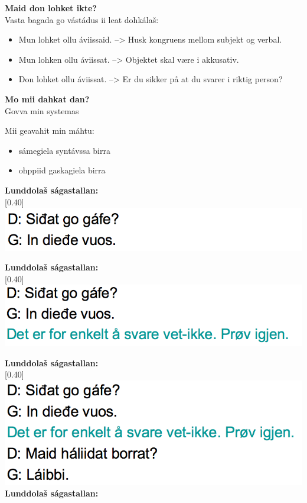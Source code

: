 \documentclass[landscape,norsk,11pt]{seminar}
\begin{document}
\begin{slide}
\newslide
\textbf{Maid don lohket ikte?}\\
Vasta bagada go vástádus ii leat dohkálaš:
\begin{itemize}
\item Mun lohket ollu \'aviissaid. --> Husk kongruens mellom subjekt og verbal.
\item Mun lohken ollu \'aviissat. --> Objektet skal være i akkusativ.
\item Don lohket ollu \'aviissat. --> Er du sikker på at du svarer i riktig person?
\end{itemize}

\newslide
\textbf{Mo mii dahkat dan?}\\
Govva min systemas

\newslide
Mii geavahit min máhtu:
\begin{itemize}
\item sámegiela syntávssa birra		
\item ohppiid gaskagiela birra
\end{itemize}


\newslide
\textbf{Lunddolaš ságastallan:} \\

\scalebox{0.40}[0.40]{\includegraphics{img/lgiella1.png}} 

\newslide
\textbf{Lunddolaš ságastallan:} \\

\scalebox{0.40}[0.40]{\includegraphics{img/lgiella2.png}} 

\newslide
\textbf{Lunddolaš ságastallan:} \\

\scalebox{0.40}[0.40]{\includegraphics{img/lgiella3.png}} 
\newslide
\textbf{Lunddolaš ságastallan:} \\


\end{slide}
\end{document}
